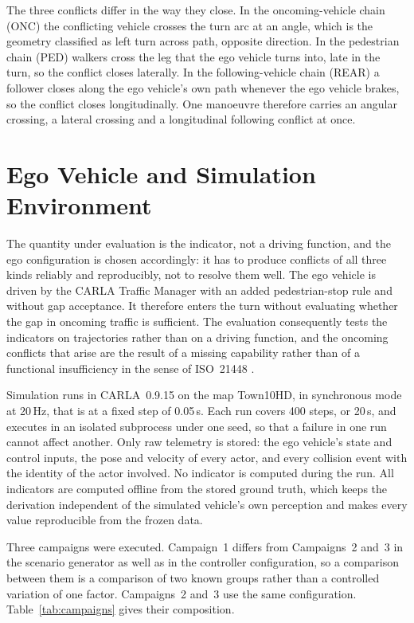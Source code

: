 The three conflicts differ in the way they close. In the oncoming-vehicle chain
(ONC) the conflicting vehicle crosses the turn arc at an angle, which is the geometry
classified as left turn across path, opposite direction. In the pedestrian chain
(PED) walkers cross the leg that the ego vehicle turns into, late in the turn, so
the conflict closes laterally. In the following-vehicle chain (REAR) a follower
closes along the ego vehicle's own path whenever the ego vehicle brakes, so the
conflict closes longitudinally. One manoeuvre therefore carries an angular
crossing, a lateral crossing and a longitudinal following conflict at once.

\section{Ego Vehicle and Simulation Environment}
\label{sec:exp_environment}

The quantity under evaluation is the indicator, not a driving function, and the
ego configuration is chosen accordingly: it has to produce conflicts of all three
kinds reliably and reproducibly, not to resolve them well. The ego vehicle is driven by the CARLA Traffic Manager with an added
pedestrian-stop rule and without gap acceptance. It therefore enters the turn
without evaluating whether the gap in oncoming traffic is sufficient. The
evaluation consequently tests the indicators on trajectories rather than on a
driving function, and the oncoming conflicts that arise are the result of a
missing capability rather than of a functional insufficiency in the sense of
ISO~21448 \cite{iso21448}.

Simulation runs in CARLA~0.9.15 \cite{dosovitskiy2017carla} on the map Town10HD,
in synchronous mode at 20\,Hz, that is at a fixed step of 0.05\,s. Each run
covers 400 steps, or 20\,s, and executes in an isolated subprocess under one
seed, so that a failure in one run cannot affect another. Only raw telemetry is
stored: the ego vehicle's state and control inputs, the pose and velocity of
every actor, and every collision event with the identity of the actor involved.
No indicator is computed during the run. All indicators are computed offline from
the stored ground truth, which keeps the derivation independent of the simulated
vehicle's own perception and makes every value reproducible from the frozen data.

Three campaigns were executed. Campaign~1 differs from Campaigns~2 and~3 in the
scenario generator as well as in the controller configuration, so a comparison
between them is a comparison of two known groups rather than a controlled
variation of one factor. Campaigns~2 and~3 use the same configuration.
Table~\ref{tab:campaigns} gives their composition.

